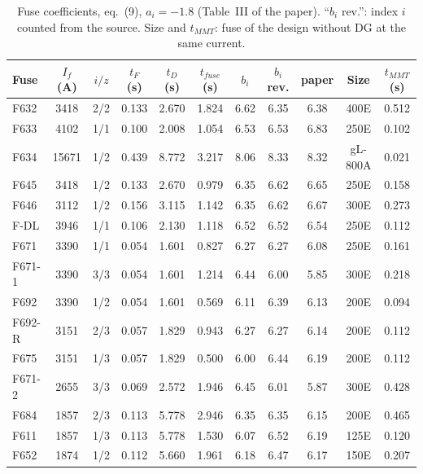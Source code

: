 \documentclass[12pt,letterpaper]{article}
\newcommand{\hd}{\rowcolor{headc}}
\begin{document}
\begin{table}[H]
\centering\footnotesize
\begin{tabular}{@{}lcccccccccc@{}}
\toprule
\hd\textbf{Fuse} & \textbf{$I_f$ (A)} & \textbf{$i/z$} & \textbf{$t_F$ (s)} & \textbf{$t_D$ (s)} & \textbf{$t_{fuse}$ (s)} &
\textbf{$b_i$} & \textbf{$b_i$ rev.} & \textbf{paper} & \textbf{Size} & \textbf{$t_{MMT}$ (s)} \\
\midrule
F632 & 3418 & 2/2 & 0.133 & 2.670 & 1.824 & 6.62 & 6.35 & 6.38 & 400E & 0.512 \\
F633 & 4102 & 1/1 & 0.100 & 2.008 & 1.054 & 6.53 & 6.53 & 6.83 & 250E & 0.102 \\
F634 & 15671 & 1/2 & 0.439 & 8.772 & 3.217 & 8.06 & 8.33 & 8.32 & gL-800A & 0.021 \\
F645 & 3418 & 1/2 & 0.133 & 2.670 & 0.979 & 6.35 & 6.62 & 6.65 & 250E & 0.158 \\
F646 & 3112 & 1/2 & 0.156 & 3.115 & 1.142 & 6.35 & 6.62 & 6.67 & 300E & 0.273 \\
F-DL & 3946 & 1/1 & 0.106 & 2.130 & 1.118 & 6.52 & 6.52 & 6.54 & 250E & 0.112 \\
F671 & 3390 & 1/1 & 0.054 & 1.601 & 0.827 & 6.27 & 6.27 & 6.08 & 250E & 0.161 \\
F671-1 & 3390 & 3/3 & 0.054 & 1.601 & 1.214 & 6.44 & 6.00 & 5.85 & 300E & 0.218 \\
F692 & 3390 & 1/2 & 0.054 & 1.601 & 0.569 & 6.11 & 6.39 & 6.13 & 200E & 0.094 \\
F692-R & 3151 & 2/3 & 0.057 & 1.829 & 0.943 & 6.27 & 6.27 & 6.14 & 200E & 0.112 \\
F675 & 3151 & 1/3 & 0.057 & 1.829 & 0.500 & 6.00 & 6.44 & 6.19 & 200E & 0.112 \\
F671-2 & 2655 & 3/3 & 0.069 & 2.572 & 1.946 & 6.45 & 6.01 & 5.87 & 300E & 0.428 \\
F684 & 1857 & 2/3 & 0.113 & 5.778 & 2.946 & 6.35 & 6.35 & 6.15 & 200E & 0.465 \\
F611 & 1857 & 1/3 & 0.113 & 5.778 & 1.530 & 6.07 & 6.52 & 6.19 & 125E & 0.120 \\
F652 & 1874 & 1/2 & 0.112 & 5.660 & 1.961 & 6.18 & 6.47 & 6.17 & 150E & 0.207 \\
\bottomrule
\end{tabular}
\caption{Fuse coefficients, eq.~(9), $a_i=-1.8$ (Table~III of the paper). ``$b_i$ rev.'': index $i$ counted
from the source. Size and $t_{MMT}$: fuse of the design without DG at the same current.}
\label{tab:t3}
\end{table}
\end{document}
